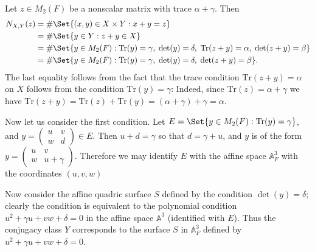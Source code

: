 \documentclass[preprint,11pt]{amsart}
\def\A{\mathbb{A}}
\theoremstyle{definition}
\numberwithin{thm}{section}
\newcommand{\gam}{\gamma}
\newcommand{\al}{\alpha}
\newcommand{\tr}{\textrm{Tr}}
\begin{document}
Let $z \in M_2(F)$ be a nonscalar matrix with trace $\al + \gam $. Then 
\begin{align*}
N_{X, Y}(z) &= \# \Set{(x,y) \in X \times Y : x + y = z} \\
&= \# \Set{y \in Y : z + y \in X} \\
&= \# \Set{y \in M_2(F) : \tr(y) = \gam, \; \det(y) = \delta, \; \tr(z+y) = \alpha, \; \det(z + y) = \beta}\\
&= \# \Set{y \in M_2(F) : \tr(y) = \gam, \; \det(y) = \delta, \; \det(z+y) = \beta}.
\end{align*}
The last equality follows from the fact that the trace condition $\tr(z +y) = \alpha$ on $X$ follows from the condition $\tr(y) = \gam$: Indeed, since $\tr(z) = \al + \gam $ we have $\tr(z+y) = \tr(z) + \tr(y) = (\al + \gam) + \gam = \al$.

Now let us consider the first condition. Let $E = \Set{y \in M_2(F) : \tr(y) = \gam}$, and $y = \begin{pmatrix} u & v \\ w & d \end{pmatrix} \in E$. Then $u + d = \gam$ so that $d = \gam + u$, and $y$ is  of the form $y = \begin{pmatrix} u & v \\ w & u + \gam \end{pmatrix}$. Therefore  we may identify $E$ with the affine space $\A_{F}^3$ with the coordinates $(u,v,w)$ 

Now consider the affine quadric surface $S$ defined by the condition $\det(y) = \delta$; clearly the condition is equivalent to the polynomial condition $u^2 + \gam u + v w + \delta = 0$ in the affine space $\A^3$ (identified with $E$). Thus the conjugacy class $Y$ corresponds to the surface $S$ in $\A^3_{F}$ defined by $u^2 + \gam u + v w + \delta = 0$.
\end{document}
